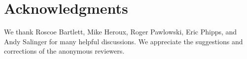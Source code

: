 \documentclass[acmtoms,acmnow]{acmtrans2m}
\begin{document}
\section{Acknowledgments}

We thank Roscoe Bartlett, Mike Heroux, Roger Pawlowski, Eric Phipps, and Andy Salinger for
many helpful discussions. We appreciate the suggestions and corrections of the anonymous
reviewers.





\begin{received}
\end{received}
\end{document}
